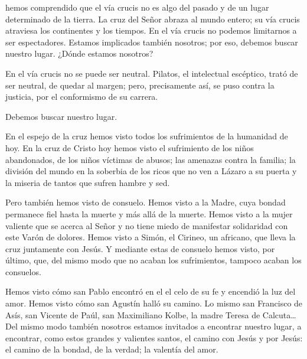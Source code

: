 
\begin{body}

 hemos comprendido que el vía crucis no es algo del pasado y de un lugar determinado de la tierra. La cruz del Señor abraza al mundo entero; su vía crucis atraviesa los continentes y los tiempos. En el vía crucis no podemos limitarnos a ser espectadores. Estamos implicados también nosotros; por eso, debemos buscar nuestro lugar. ¿Dónde estamos nosotros? 

En el vía crucis no se puede ser neutral. Pilatos, el intelectual escéptico, trató de ser neutral, de quedar al margen; pero, precisamente así, se puso contra la justicia, por el conformismo de su carrera. 

Debemos buscar nuestro lugar.

En el espejo de la cruz hemos visto todos los sufrimientos de la humanidad de hoy. En la cruz de Cristo hoy hemos visto el sufrimiento de los niños abandonados, de los niños víctimas de abusos; las amenazas contra la familia; la división del mundo en la soberbia de los ricos que no ven a Lázaro a su puerta y la miseria de tantos que sufren hambre y sed. 

Pero también hemos visto  de consuelo. Hemos visto a la Madre, cuya bondad permanece fiel hasta la muerte y más allá de la muerte. Hemos visto a la mujer valiente que se acerca al Señor y no tiene miedo de manifestar solidaridad con este Varón de dolores. Hemos visto a Simón, el Cirineo, un africano, que lleva la cruz juntamente con Jesús. Y mediante estas  de consuelo hemos visto, por último, que, del mismo modo que no acaban los sufrimientos, tampoco acaban los consuelos. 

Hemos visto cómo san Pablo encontró en el  el celo de su fe y encendió la luz del amor. Hemos visto cómo san Agustín halló su camino. Lo mismo san Francisco de Asís, san Vicente de Paúl, san Maximiliano Kolbe, la madre Teresa de Calcuta\ldots Del mismo modo también nosotros estamos invitados a encontrar nuestro lugar, a encontrar, como estos grandes y valientes santos, el camino con Jesús y por Jesús: el camino de la bondad, de la verdad; la valentía del amor.


\end{body}

